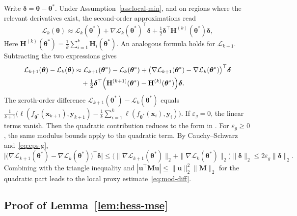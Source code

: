 \documentclass[10pt,letterpaper]{article}
\theoremstyle{definition}
\begin{document}
Write $\boldsymbol{\delta}=\boldsymbol{\theta}-\boldsymbol{\theta}^*$.
Under Assumption~\ref{ass:local-min}, and on regions where the relevant derivatives exist, the second-order approximations read
\[
  \mathcal{L}_k(\boldsymbol{\theta})
  \approx \mathcal{L}_k(\boldsymbol{\theta}^*)
  + \nabla\mathcal{L}_k(\boldsymbol{\theta}^*)^\top\boldsymbol{\delta}
  + \tfrac{1}{2}\boldsymbol{\delta}^\top \mathbf{H}^{(k)}(\boldsymbol{\theta}^*)\boldsymbol{\delta},
\]
Here $\mathbf{H}^{(k)}(\boldsymbol{\theta}^*)=\frac{1}{k}\sum_{i=1}^k \mathbf{H}_i(\boldsymbol{\theta}^*)$. An analogous formula holds for $\mathcal{L}_{k+1}$. Subtracting the two expressions gives
\begin{align*}
  \mathcal{L}_{k+1}(\boldsymbol{\theta}) - \mathcal{L}_k(\boldsymbol{\theta})
  &\approx \mathcal{L}_{k+1}(\boldsymbol{\theta}^*) - \mathcal{L}_k(\boldsymbol{\theta}^*)
  + \bigl(\nabla\mathcal{L}_{k+1}(\boldsymbol{\theta}^*) - \nabla\mathcal{L}_k(\boldsymbol{\theta}^*)\bigr)^\top\boldsymbol{\delta}
  \\
  &\quad + \tfrac{1}{2}\boldsymbol{\delta}^\top
  \Bigl(\mathbf{H}^{(k+1)}(\boldsymbol{\theta}^*) - \mathbf{H}^{(k)}(\boldsymbol{\theta}^*)\Bigr)\boldsymbol{\delta}.
\end{align*}
The zeroth-order difference $\mathcal{L}_{k+1}(\boldsymbol{\theta}^*) - \mathcal{L}_k(\boldsymbol{\theta}^*)$ equals
$\frac{1}{k+1}\bigl(\ell(f_{\boldsymbol{\theta}^*}(\mathbf{x}_{k+1}),\mathbf{y}_{k+1}) - \frac{1}{k}\sum_{i=1}^{k}\ell(f_{\boldsymbol{\theta}^*}(\mathbf{x}_{i}),\mathbf{y}_{i})\bigr)$.
If $\varepsilon_g=0$, the linear terms vanish. Then the quadratic contribution reduces to the form in \cite{kiselev2024hessian}. For $\varepsilon_g\ge 0$, the same modulus bounds apply to the quadratic term.
By Cauchy--Schwarz and~\eqref{eq:eps-g},
\[
  \bigl|\bigl(\nabla\mathcal{L}_{k+1}(\boldsymbol{\theta}^*) - \nabla\mathcal{L}_k(\boldsymbol{\theta}^*)\bigr)^\top\boldsymbol{\delta}\bigr|
  \le \bigl(\|\nabla\mathcal{L}_{k+1}(\boldsymbol{\theta}^*)\|_2 + \|\nabla\mathcal{L}_k(\boldsymbol{\theta}^*)\|_2\bigr)\|\boldsymbol{\delta}\|_2
  \le 2\varepsilon_g\|\boldsymbol{\delta}\|_2 .
\]
Combining with the triangle inequality and $|\mathbf{u}^\top \mathbf{M}\mathbf{u}|\le \|\mathbf{u}\|_2^2\|\mathbf{M}\|_2$ for the quadratic part leads to the local proxy estimate~\eqref{eq:mod-diff}.

\subsection{Proof of Lemma~\ref{lem:hess-mse}}\label{app:proof-lemma-hess}
\end{document}
